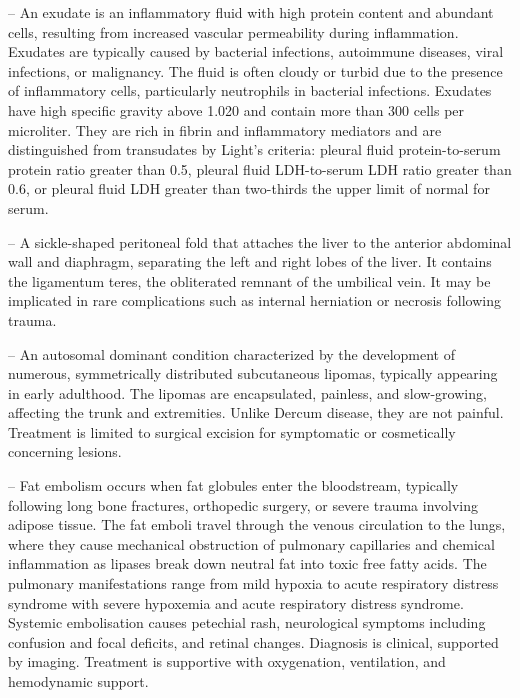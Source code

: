 -- An exudate is an inflammatory fluid with high protein content and abundant cells, resulting from increased vascular permeability during inflammation. Exudates are typically caused by bacterial infections, autoimmune diseases, viral infections, or malignancy. The fluid is often cloudy or turbid due to the presence of inflammatory cells, particularly neutrophils in bacterial infections. Exudates have high specific gravity above 1.020 and contain more than 300 cells per microliter. They are rich in fibrin and inflammatory mediators and are distinguished from transudates by Light's criteria: pleural fluid protein-to-serum protein ratio greater than 0.5, pleural fluid LDH-to-serum LDH ratio greater than 0.6, or pleural fluid LDH greater than two-thirds the upper limit of normal for serum.

-- A sickle-shaped peritoneal fold that attaches the liver to the anterior abdominal wall and diaphragm, separating the left and right lobes of the liver. It contains the ligamentum teres, the obliterated remnant of the umbilical vein. It may be implicated in rare complications such as internal herniation or necrosis following trauma.

-- An autosomal dominant condition characterized by the development of numerous, symmetrically distributed subcutaneous lipomas, typically appearing in early adulthood. The lipomas are encapsulated, painless, and slow-growing, affecting the trunk and extremities. Unlike Dercum disease, they are not painful. Treatment is limited to surgical excision for symptomatic or cosmetically concerning lesions.

-- Fat embolism occurs when fat globules enter the bloodstream, typically following long bone fractures, orthopedic surgery, or severe trauma involving adipose tissue. The fat emboli travel through the venous circulation to the lungs, where they cause mechanical obstruction of pulmonary capillaries and chemical inflammation as lipases break down neutral fat into toxic free fatty acids. The pulmonary manifestations range from mild hypoxia to acute respiratory distress syndrome with severe hypoxemia and acute respiratory distress syndrome. Systemic embolisation causes petechial rash, neurological symptoms including confusion and focal deficits, and retinal changes. Diagnosis is clinical, supported by imaging. Treatment is supportive with oxygenation, ventilation, and hemodynamic support.

